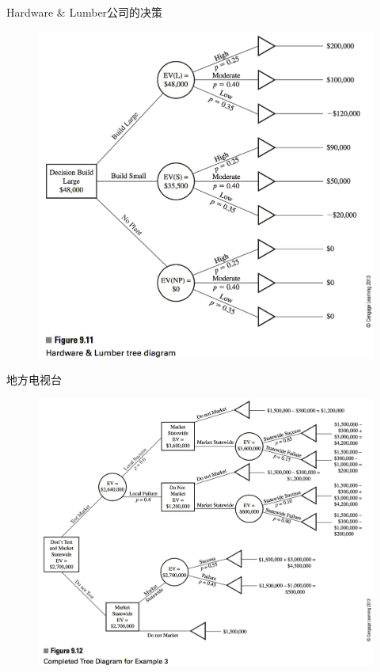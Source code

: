 \documentclass[UTF8]{ctexbeamer}
\begin{document}
\begin{frame}{Hardware \& Lumber公司的决策}
  
  \begin{figure}
    \centering
    \includegraphics[height=0.8\textheight{}]{9_11.png}
  \end{figure}

\end{frame}

\begin{frame}{地方电视台}
  
  \begin{figure}
    \centering
    \includegraphics[height=0.8\textheight{}]{9_12.png}
  \end{figure}

\end{frame}
\end{document}

